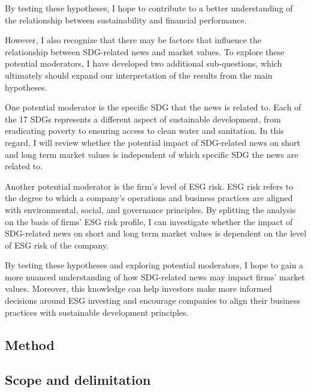 By testing these hypotheses, I hope to contribute to a better understanding of the relationship between sustainability and financial performance. 

However, I also recognize that there may be factors that influence the relationship between SDG-related news and market values. 
To explore these potential moderators, I have developed two additional sub-questions, which ultimately should expand our interpretation of the results from the main hypotheses. 

One potential moderator is the specific SDG that the news is related to. Each of the 17 SDGs represents a different aspect of sustainable development, from eradicating poverty to ensuring access to clean water and sanitation. In this regard, I will review whether the potential impact of SDG-related news on short and long term market values is independent of which specific SDG the news are related to.

Another potential moderator is the firm's level of ESG risk. ESG risk refers to the degree to which a company's operations and business practices are aligned with environmental, social, and governance principles.
By splitting the analysis on the basis of firms' ESG risk profile, I can investigate whether the impact of SDG-related news on short and long term market values is dependent on the level of ESG risk of the company. 

 
By testing these hypotheses and exploring potential moderators, I hope to gain a more nuanced understanding of how SDG-related news may impact firms' market values. Moreover, this knowledge can help investors make more informed decisions around ESG investing and encourage companies to align their business practices with sustainable development principles.


\subsection{Method}

\subsection{Scope and delimitation}

